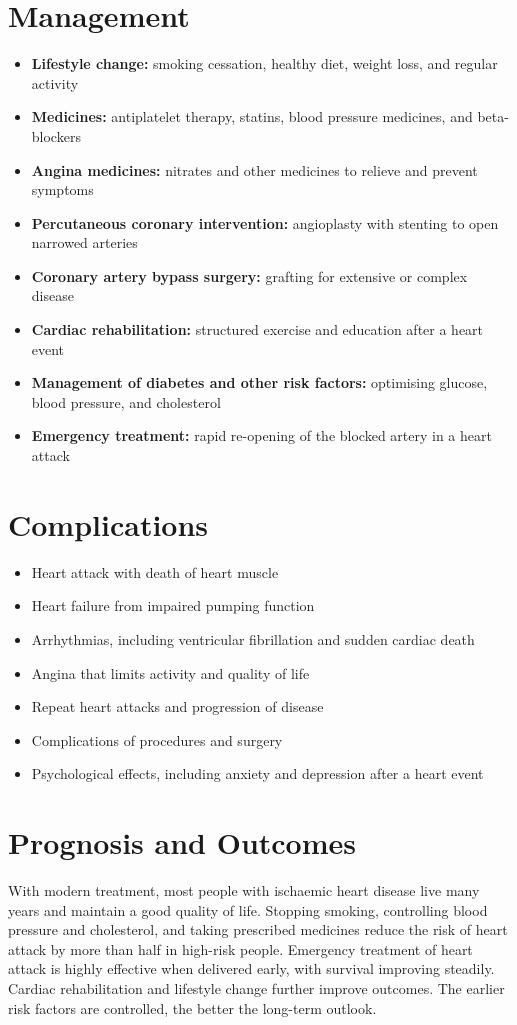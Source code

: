 \section*{Management}
\begin{itemize}
    \item \textbf{Lifestyle change:} smoking cessation, healthy diet, weight loss, and regular activity
    \item \textbf{Medicines:} antiplatelet therapy, statins, blood pressure medicines, and beta-blockers
    \item \textbf{Angina medicines:} nitrates and other medicines to relieve and prevent symptoms
    \item \textbf{Percutaneous coronary intervention:} angioplasty with stenting to open narrowed arteries
    \item \textbf{Coronary artery bypass surgery:} grafting for extensive or complex disease
    \item \textbf{Cardiac rehabilitation:} structured exercise and education after a heart event
    \item \textbf{Management of diabetes and other risk factors:} optimising glucose, blood pressure, and cholesterol
    \item \textbf{Emergency treatment:} rapid re-opening of the blocked artery in a heart attack
\end{itemize}

\section*{Complications}
\begin{itemize}
    \item Heart attack with death of heart muscle
    \item Heart failure from impaired pumping function
    \item Arrhythmias, including ventricular fibrillation and sudden cardiac death
    \item Angina that limits activity and quality of life
    \item Repeat heart attacks and progression of disease
    \item Complications of procedures and surgery
    \item Psychological effects, including anxiety and depression after a heart event
\end{itemize}

\section*{Prognosis and Outcomes}
With modern treatment, most people with ischaemic heart disease live many years and maintain a good quality of life. Stopping smoking, controlling blood pressure and cholesterol, and taking prescribed medicines reduce the risk of heart attack by more than half in high-risk people. Emergency treatment of heart attack is highly effective when delivered early, with survival improving steadily. Cardiac rehabilitation and lifestyle change further improve outcomes. The earlier risk factors are controlled, the better the long-term outlook.

